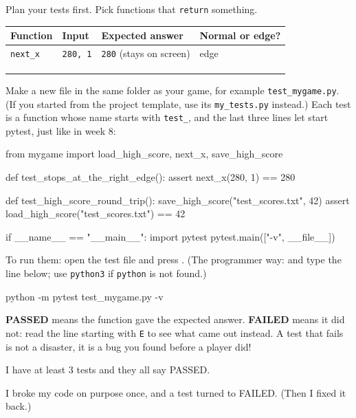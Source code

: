 \begin{exercise}
Plan your tests first. Pick functions that \texttt{return} something.

\renewcommand{\arraystretch}{1.6}
\begin{tabularx}{\linewidth}{|X|X|X|p{2.3cm}|}
\hline
\textbf{Function} & \textbf{Input} & \textbf{Expected answer} & \textbf{Normal or edge?} \\ \hline
\texttt{next\_x} & \texttt{280, 1} & \texttt{280} (stays on screen) & edge \\ \hline
 & & & \\ \hline
 & & & \\ \hline
 & & & \\ \hline
\end{tabularx}

Make a new file in the same folder as your game, for example \texttt{test\_mygame.py}. (If you
started from the project template, use its \texttt{my\_tests.py} instead.) Each test is a function
whose name starts with \texttt{test\_}, and the last three lines let  start pytest, just
like in week 8:
\begin{pycode}
from mygame import load_high_score, next_x, save_high_score

def test_stops_at_the_right_edge():
    assert next_x(280, 1) == 280

def test_high_score_round_trip():
    save_high_score("test_scores.txt", 42)
    assert load_high_score("test_scores.txt") == 42

if __name__ == "__main__":
    import pytest
    pytest.main(["-v", __file__])
\end{pycode}
To run them: open the test file and press . (The programmer way:  and type the line below; use \texttt{python3} if \texttt{python} is not found.)
\begin{shellcode}
python -m pytest test_mygame.py -v
\end{shellcode}
\textbf{PASSED} means the function gave the expected answer. \textbf{FAILED} means it did not: read the
line starting with \texttt{E} to see what came out instead. A test that fails is not a disaster, it is
a bug you found before a player did!
\begin{checklist}
  \item I have at least 3 tests and they all say PASSED.
  \item I broke my code on purpose once, and a test turned to FAILED. (Then I fixed it back.)
\end{checklist}
\end{exercise}

